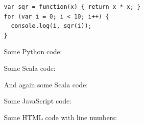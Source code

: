 \documentclass[a4paper, 12pt, hidelinks, listof=totoc, listoftables=totoc, bibliography=totoc]{scrreprt}
\begin{document}
\begin{lstlisting}
var sqr = function(x) { return x * x; }
for (var i = 0; i < 10; i++) {
  console.log(i, sqr(i));
}
\end{lstlisting}

Some Python code:





Some Scala code:


And again some Scala code:





Some JavaScript code:





Some HTML code with line numbers:







\listoffigures

\listoftables

\lstlistoflistings

%
%
%
\end{document}
